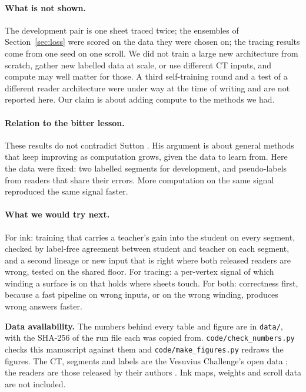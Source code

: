 \documentclass[11pt]{article}
\begin{document}
\paragraph{What is not shown.} The development pair is one sheet traced twice; the ensembles of Section~\ref{sec:loss} were scored on the data they were chosen on; the tracing results come from one seed on one scroll. We did not train a large new architecture from scratch, gather new labelled data at scale, or use different CT inputs, and compute may well matter for those. A third self-training round and a test of a different reader architecture were under way at the time of writing and are not reported here. Our claim is about adding compute to the methods we had.

\paragraph{Relation to the bitter lesson.} These results do not contradict Sutton \cite{sutton}. His argument is about general methods that keep improving as computation grows, given the data to learn from. Here the data were fixed: two labelled segments for development, and pseudo-labels from readers that share their errors. More computation on the same signal reproduced the same signal faster.

\paragraph{What we would try next.} For ink: training that carries a teacher's gain into the student on every segment, checked by label-free agreement between student and teacher on each segment, and a second lineage or new input that is right where both released readers are wrong, tested on the shared floor. For tracing: a per-vertex signal of which winding a surface is on that holds where sheets touch. For both: correctness first, because a fast pipeline on wrong inputs, or on the wrong winding, produces wrong answers faster.

{\raggedright\noindent\textbf{Data availability.} The numbers behind every table and figure are in \texttt{data/}, with the SHA-256 of the run file each was copied from. \texttt{code/check\_numbers.py} checks this manuscript against them and \texttt{code/make\_figures.py} redraws the figures. The CT, segments and labels are the Vesuvius Challenge's open data \cite{opendata}; the readers are those released by their authors \cite{ink9um, readerv2, d9v2}. Ink maps, weights and scroll data are not included.\par}
\end{document}
